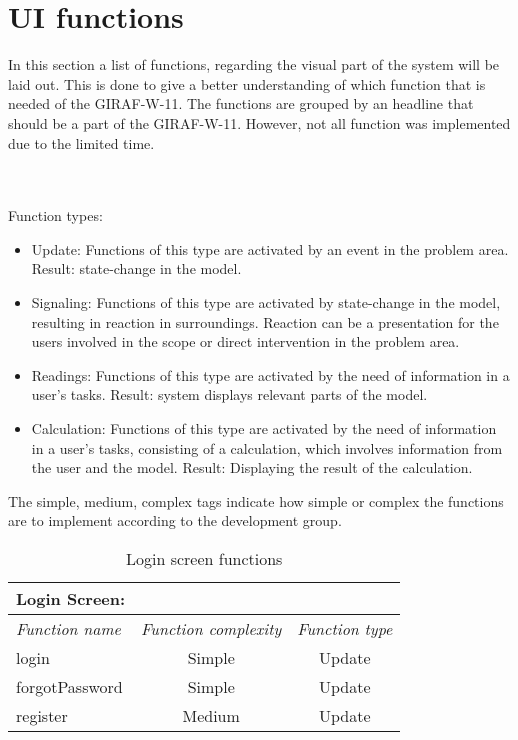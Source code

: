 \newpage
\section{UI functions}
In this section a list of functions, regarding the visual part of the system will be laid out. This is done to give a better understanding of which function that is needed of the GIRAF-W-11. The functions are grouped by an headline that should be a part of the GIRAF-W-11. However, not all function was implemented due to the limited time. 
  
\\
\\
Function types:
\begin{itemize}
\item{Update: Functions of this type are activated by an event in the problem area. Result: state-change in the model.}

\item{Signaling: Functions of this type are activated by state-change in the model, resulting in reaction in surroundings. Reaction can be a presentation for the users involved in the scope or direct intervention in the problem area.}

\item{Readings: Functions of this type are activated by the need of information in a user's tasks. Result: system displays relevant parts of the model.}

\item{Calculation: Functions of this type are activated by the need of information in a user's tasks, consisting of a calculation, which involves information from the user and the model. Result: Displaying the result of the calculation.}

\end{itemize}

The simple, medium, complex tags indicate how simple or complex the functions are to implement according to the development group.

\begin{table}[!ht]
\centering
\begin{tabular}{ l  c  c }

Login Screen: &  & \\ \hline
\textit{Function name} & \textit{Function complexity} & \textit{Function type} \\ \hline
login & Simple & Update \\ \hline
forgotPassword & Simple & Update \\ \hline
register & Medium & Update \\ \hline
\end{tabular}
\caption{Login screen functions}
\label{tbl:loginscreen}
\end{table}

